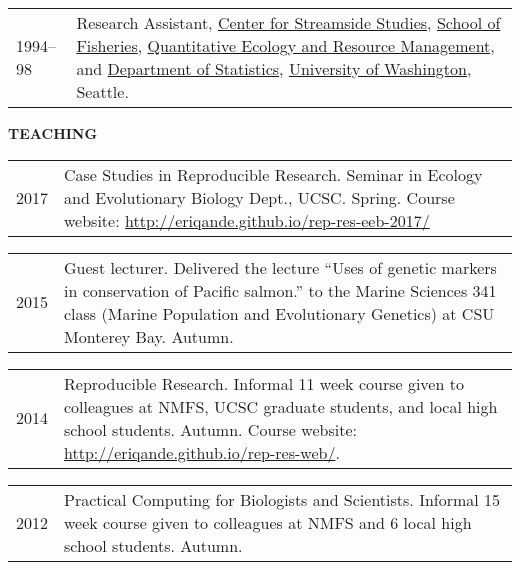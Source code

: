 \documentclass[11pt]{article}
\newlength{\myindent}
\newlength{\postskip}
\newlength{\preskip}
\newlength{\scndcol}
\begin{document}
\begin{tabular}{ @{}p{2.5\myindent} p{\scndcol}@{}  }
\hspace*{\myindent}1994--98 &  Research Assistant, \href{http://depts.washington.edu/cssuw/}{Center for Streamside
Studies},  \href{http://www.fish.washington.edu/}{School of Fisheries}, \href{http://depts.washington.edu/qerm/}{Quantitative Ecology and Resource
Management}, and \href{http://www.stat.washington.edu/}{Department of Statistics}, \href{http://www.washington.edu/}{University of Washington}, Seattle. \\
\end{tabular}
\vspace*{\postskip}


{\bf TEACHING}
\vspace*{\preskip}

\begin{tabular}{ @{}p{2.5\myindent} p{\scndcol}@{}  }
\hspace*{\myindent}2017 &  Case Studies in Reproducible Research. Seminar in Ecology and Evolutionary
Biology Dept., UCSC. Spring.  Course website: \url{http://eriqande.github.io/rep-res-eeb-2017/}
\end{tabular}

\begin{tabular}{ @{}p{2.5\myindent} p{\scndcol}@{}  }
\hspace*{\myindent}2015 &  Guest lecturer. Delivered the lecture ``Uses of genetic markers in conservation
of Pacific salmon.'' to the Marine Sciences 341 class (Marine Population and Evolutionary Genetics) at 
CSU Monterey Bay. Autumn.
\end{tabular}


\begin{tabular}{ @{}p{2.5\myindent} p{\scndcol}@{}  }
\hspace*{\myindent}2014 &  Reproducible Research. Informal 11 week course given to colleagues at NMFS, UCSC graduate students, and local high school students. Autumn.  Course website: \url{http://eriqande.github.io/rep-res-web/}.
\end{tabular}


\begin{tabular}{ @{}p{2.5\myindent} p{\scndcol}@{}  }
\hspace*{\myindent}2012 &  Practical Computing for Biologists and Scientists. Informal 15 week course given to colleagues at NMFS and 6 local high school students. Autumn.
\end{tabular}
\end{document}
